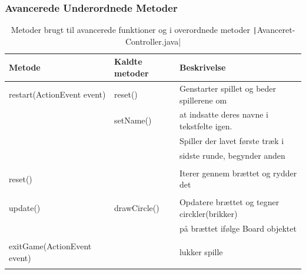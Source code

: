 \subsubsection{Avancerede Underordnede Metoder}
\begin{table}[H]
    \centering
    \caption{Metoder  brugt til avancerede funktioner og i overordnede metoder \texttt|Avanceret-Controller.java|}\label{tbl:2}
    \begin{tabular}{lll}
        \toprule
        Metode                               & Kaldte metoder  & Beskrivelse                                               \\
        \midrule
        restart(ActionEvent event)           & reset()         & Genstarter spillet og beder spillerene om                 \\
                                             & setName()       & at indsatte deres navne  i tekstfelte igen.               \\
                                             &                 & Spiller der lavet første træk i                           \\
                                             &                 & sidste runde, begynder anden                              \\
                                             &                 &                                                           \\
        reset()                              &                 & Iterer gennem brættet og rydder det                       \\
                                             &                 &                                                           \\
        update()                             & drawCircle()    & Opdatere brættet og tegner circkler(brikker)              \\
                                             &                 & på brættet ifølge Board objektet                          \\
                                             &                 &                                                           \\
        exitGame(ActionEvent event)          &                 & lukker spille                                             \\
                                             &                 &                                                           \\

\end{tabular}
\end{table}
